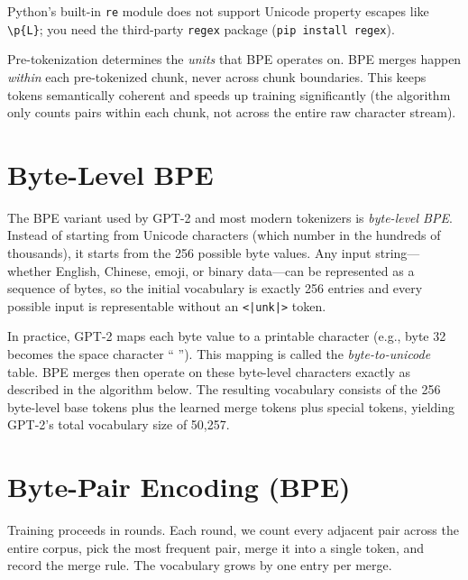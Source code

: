 Python's built-in \texttt{re} module does not support Unicode property
escapes like \texttt{\textbackslash p\{L\}}; you need the third-party
\texttt{regex} package (\texttt{pip install regex}).

Pre-tokenization determines the \emph{units} that BPE operates on. BPE
merges happen \emph{within} each pre-tokenized chunk, never across chunk
boundaries. This keeps tokens semantically coherent and speeds up training
significantly (the algorithm only counts pairs within each chunk, not
across the entire raw character stream).

\section{Byte-Level BPE}

The BPE variant used by GPT-2 and most modern tokenizers is
\emph{byte-level BPE}. Instead of starting from Unicode characters (which
number in the hundreds of thousands), it starts from the 256 possible byte
values. Any input string---whether English, Chinese, emoji, or binary
data---can be represented as a sequence of bytes, so the initial
vocabulary is exactly 256 entries and every possible input is
representable without an \texttt{<|unk|>} token.

In practice, GPT-2 maps each byte value to a printable character (e.g.,
byte 32 becomes the space character `` ''). This mapping is called the
\emph{byte-to-unicode} table. BPE merges then operate on these byte-level
characters exactly as described in the algorithm below. The resulting
vocabulary consists of the 256 byte-level base tokens plus the learned
merge tokens plus special tokens, yielding GPT-2's total vocabulary size
of 50,257.

\section{Byte-Pair Encoding (BPE)}

Training proceeds in rounds. Each round, we count every adjacent pair
across the entire corpus, pick the most frequent pair, merge it into a
single token, and record the merge rule. The vocabulary grows by one
entry per merge.

